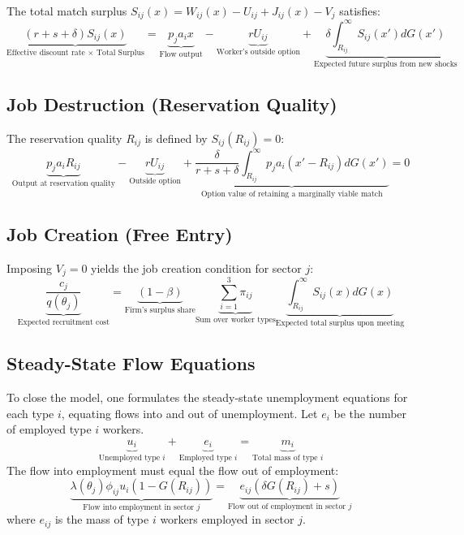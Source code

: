 \documentclass[11pt]{article}
\begin{document}
The total match surplus $S_{ij}(x) = W_{ij}(x) - U_{ij} + J_{ij}(x) - V_j$ satisfies:
\begin{equation}
\underbrace{(r + s + \delta) S_{ij}(x)}_{\text{Effective discount rate $\times$ Total Surplus}} = \underbrace{p_j a_i x}_{\text{Flow output}} - \underbrace{r U_{ij}}_{\text{Worker's outside option}} + \underbrace{\delta \int_{R_{ij}}^\infty S_{ij}(x') dG(x')}_{\text{Expected future surplus from new shocks}}
\end{equation}

\subsection{Job Destruction (Reservation Quality)}
The reservation quality $R_{ij}$ is defined by $S_{ij}(R_{ij}) = 0$:
\begin{equation}
\underbrace{p_j a_i R_{ij}}_{\text{Output at reservation quality}} - \underbrace{r U_{ij}}_{\text{Outside option}} + \underbrace{\frac{\delta}{r + s + \delta} \int_{R_{ij}}^\infty p_j a_i (x' - R_{ij}) dG(x')}_{\text{Option value of retaining a marginally viable match}} = 0
\end{equation}

\subsection{Job Creation (Free Entry)}
Imposing $V_j = 0$ yields the job creation condition for sector $j$:
\begin{equation}
\underbrace{\frac{c_j}{q(\theta_j)}}_{\text{Expected recruitment cost}} = \underbrace{(1-\beta)}_{\text{Firm's surplus share}} \underbrace{\sum_{i=1}^3 \pi_{ij}}_{\text{Sum over worker types}} \underbrace{\int_{R_{ij}}^\infty S_{ij}(x) dG(x)}_{\text{Expected total surplus upon meeting}}
\end{equation}

\subsection{Steady-State Flow Equations}
To close the model, one formulates the steady-state unemployment equations for each type $i$, equating flows into and out of unemployment. Let $e_i$ be the number of employed type $i$ workers.
\begin{equation}
\underbrace{u_i}_{\text{Unemployed type $i$}} + \underbrace{e_i}_{\text{Employed type $i$}} = \underbrace{m_i}_{\text{Total mass of type $i$}}
\end{equation}
The flow into employment must equal the flow out of employment:
\begin{equation}
\underbrace{\lambda(\theta_j) \phi_{ij} u_i (1 - G(R_{ij}))}_{\text{Flow into employment in sector $j$}} = \underbrace{e_{ij} (\delta G(R_{ij}) + s)}_{\text{Flow out of employment in sector $j$}}
\end{equation}
where $e_{ij}$ is the mass of type $i$ workers employed in sector $j$.
\end{document}
